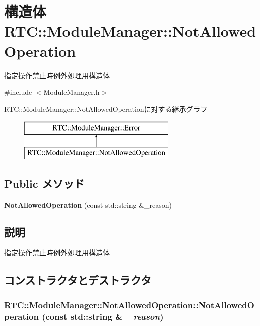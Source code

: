 \section{構造体 RTC::ModuleManager::NotAllowedOperation}
\label{structRTC_1_1ModuleManager_1_1NotAllowedOperation}


指定操作禁止時例外処理用構造体  




{\ttfamily \#include $<$ModuleManager.h$>$}

RTC::ModuleManager::NotAllowedOperationに対する継承グラフ\begin{figure}[H]
\begin{center}
\leavevmode
\includegraphics[height=2cm]{structRTC_1_1ModuleManager_1_1NotAllowedOperation}
\end{center}
\end{figure}
\subsection*{Public メソッド}
\begin{DoxyCompactItemize}
\item 
{\bf NotAllowedOperation} (const std::string \&\_\-reason)
\end{DoxyCompactItemize}


\subsection{説明}
指定操作禁止時例外処理用構造体 

\subsection{コンストラクタとデストラクタ}
\subsubsection[{NotAllowedOperation}]{\setlength{\rightskip}{0pt plus 5cm}RTC::ModuleManager::NotAllowedOperation::NotAllowedOperation (const std::string \& {\em \_\-reason})\hspace{0.3cm}{\ttfamily  [inline]}}\label{structRTC_1_1ModuleManager_1_1NotAllowedOperation_ac7b43e23a013618df637bdd777c90dbc}
